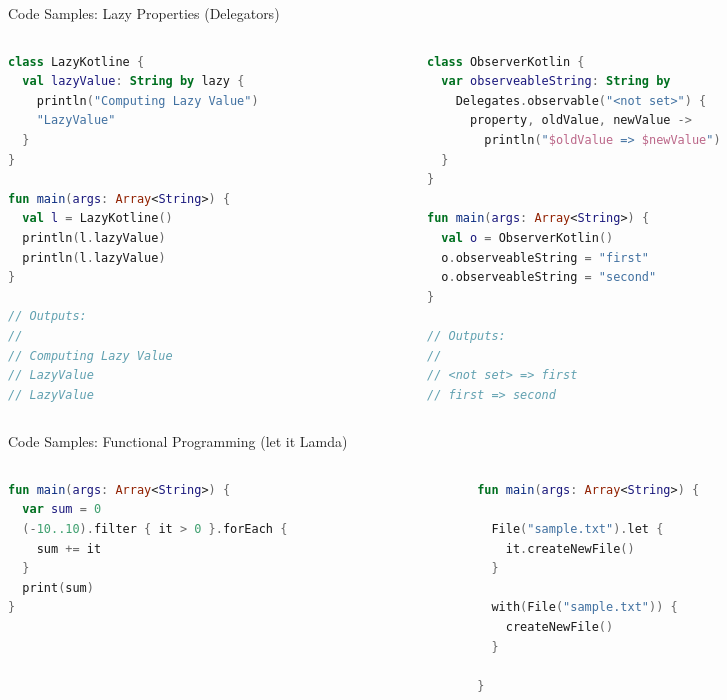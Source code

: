 \begin{frame}[fragile]{Code Samples: Lazy Properties (Delegators)}
	\begin{columns}
		\begin{column}{0.5\textwidth}
\begin{lstlisting}[language=Kotlin,basicstyle=\ttfamily\tiny]
class LazyKotline {
  val lazyValue: String by lazy {
    println("Computing Lazy Value")
    "LazyValue"
  }
}

fun main(args: Array<String>) {
  val l = LazyKotline()
  println(l.lazyValue)
  println(l.lazyValue)
}

// Outputs:
//
// Computing Lazy Value
// LazyValue
// LazyValue
\end{lstlisting}
		\end{column}
		\begin{column}{0.5\textwidth}
\begin{lstlisting}[language=Kotlin,basicstyle=\ttfamily\tiny]
class ObserverKotlin {
  var observeableString: String by
    Delegates.observable("<not set>") {
      property, oldValue, newValue ->
        println("$oldValue => $newValue")
  }
}

fun main(args: Array<String>) {
  val o = ObserverKotlin()
  o.observeableString = "first"
  o.observeableString = "second"
}

// Outputs:
//
// <not set> => first
// first => second
\end{lstlisting}
		\end{column}
	\end{columns}
\end{frame}

\begin{frame}[fragile]{Code Samples: Functional Programming (let it Lamda)}
	\begin{columns}
		\begin{column}{0.5\textwidth}
\begin{lstlisting}[language=Kotlin,basicstyle=\ttfamily\tiny]
fun main(args: Array<String>) {
  var sum = 0
  (-10..10).filter { it > 0 }.forEach {
    sum += it
  }
  print(sum)
}
\end{lstlisting}
		\end{column}
		\begin{column}{0.5\textwidth}
\begin{lstlisting}[language=Kotlin,basicstyle=\ttfamily\tiny]
fun main(args: Array<String>) {

  File("sample.txt").let {
    it.createNewFile()
  }

  with(File("sample.txt")) {
    createNewFile()
  }

}
\end{lstlisting}
		\end{column}
	\end{columns}
\end{frame}

